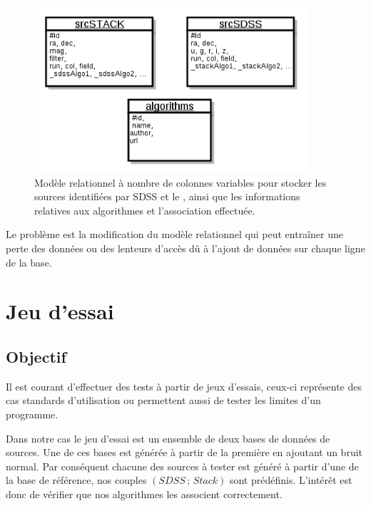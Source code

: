 	\begin{figure}[h]
		\centering
		\includegraphics[width=0.9\textwidth]{img/bdd_colvar.png}
		\caption[Modèle relationnel à colonnes variables]{Modèle relationnel à nombre de colonnes variables pour stocker les sources identifiées par SDSS et le \stack{}, ainsi que les informations relatives aux algorithmes et l'association effectuée.}
		\label{fig:bdd_colvar}
	\end{figure}

Le problème est la modification du modèle relationnel qui peut entraîner une perte des données ou des lenteurs d'accès dû à l'ajout de données sur chaque ligne de la base.


\section{Jeu d'essai}

	\subsection{Objectif}

Il est courant d'effectuer des tests à partir de jeux d'essais, ceux-ci représente des cas standards d'utilisation ou permettent aussi de tester les limites d'un programme.

Dans notre cas le jeu d'essai est un ensemble de deux bases de données de sources. Une de ces bases est générée à partir de la première en ajoutant un bruit normal. Par conséquent chacune des sources à tester est généré à partir d'une de la base de référence, nos couples $(SDSS\,;\,Stack)$ sont prédéfinis. L'intérêt est donc de vérifier que nos algorithmes les associent correctement.


